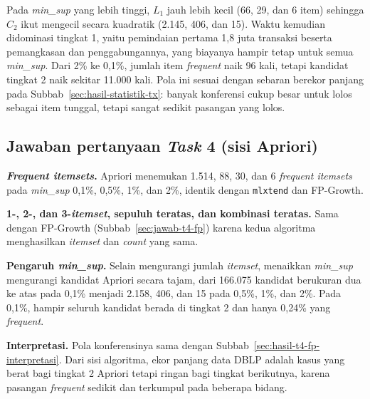 Pada \textit{min\_sup} yang lebih tinggi, $L_1$ jauh lebih kecil (66, 29, dan 6 item) sehingga $C_2$ ikut mengecil secara kuadratik (2.145, 406, dan 15). Waktu kemudian didominasi tingkat 1, yaitu pemindaian pertama 1,8 juta transaksi beserta pemangkasan dan penggabungannya, yang biayanya hampir tetap untuk semua \textit{min\_sup}. Dari 2\% ke 0,1\%, jumlah item \textit{frequent} naik 96 kali, tetapi kandidat tingkat 2 naik sekitar 11.000 kali. Pola ini sesuai dengan sebaran berekor panjang pada Subbab~\ref{sec:hasil-statistik-tx}: banyak konferensi cukup besar untuk lolos sebagai item tunggal, tetapi sangat sedikit pasangan yang lolos.

\subsection{Jawaban pertanyaan \textit{Task} 4 (sisi Apriori)}
\label{sec:jawab-t4-apriori}
\textbf{\textit{Frequent itemsets}.} Apriori menemukan 1.514, 88, 30, dan 6 \textit{frequent itemsets} pada \textit{min\_sup} 0,1\%, 0,5\%, 1\%, dan 2\%, identik dengan \texttt{mlxtend} dan FP-Growth.

\textbf{1-, 2-, dan 3-\textit{itemset}, sepuluh teratas, dan kombinasi teratas.} Sama dengan FP-Growth (Subbab~\ref{sec:jawab-t4-fp}) karena kedua algoritma menghasilkan \textit{itemset} dan \textit{count} yang sama.

\textbf{Pengaruh \textit{min\_sup}.} Selain mengurangi jumlah \textit{itemset}, menaikkan \textit{min\_sup} mengurangi kandidat Apriori secara tajam, dari 166.075 kandidat berukuran dua ke atas pada 0,1\% menjadi 2.158, 406, dan 15 pada 0,5\%, 1\%, dan 2\%. Pada 0,1\%, hampir seluruh kandidat berada di tingkat 2 dan hanya 0,24\% yang \textit{frequent}.

\textbf{Interpretasi.} Pola konferensinya sama dengan Subbab~\ref{sec:hasil-t4-fp-interpretasi}. Dari sisi algoritma, ekor panjang data DBLP adalah kasus yang berat bagi tingkat 2 Apriori tetapi ringan bagi tingkat berikutnya, karena pasangan \textit{frequent} sedikit dan terkumpul pada beberapa bidang.
